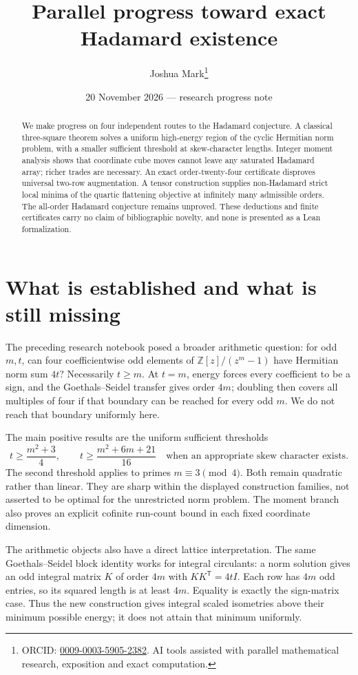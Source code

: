 \documentclass[11pt]{article}
\title{Parallel progress toward exact Hadamard existence}
\author{Joshua Mark\thanks{ORCID: \href{https://orcid.org/0009-0003-5905-2382}{0009-0003-5905-2382}. AI tools assisted with parallel mathematical research, exposition and exact computation.}}
\date{20 November 2026 --- research progress note}
\newcommand{\Z}{\mathbb Z}
\begin{document}
\maketitle
\begin{abstract}
We make progress on four independent routes to the Hadamard conjecture.
A classical three-square theorem solves a uniform high-energy region of
the cyclic Hermitian norm problem, with a smaller sufficient threshold
at skew-character lengths. Integer moment analysis shows that coordinate
cube moves cannot leave any saturated Hadamard array; richer trades are
necessary. An exact order-twenty-four certificate disproves universal
two-row augmentation. A tensor construction supplies non-Hadamard strict
local minima of the quartic flattening objective at infinitely many
admissible orders. The all-order Hadamard conjecture remains unproved.
These deductions and finite certificates carry no claim of bibliographic
novelty, and none is presented as a Lean formalization.
\end{abstract}

\section{What is established and what is still missing}
The preceding research notebook posed a broader arithmetic question:
for odd $m,t$, can four coefficientwise odd elements of
$\Z[z]/(z^m-1)$ have Hermitian norm sum $4t$? Necessarily $t\ge m$.
At $t=m$, energy forces every coefficient to be a sign, and the
Goethals--Seidel transfer gives order $4m$; doubling then covers all
multiples of four if that boundary can be reached for every odd $m$.
We do not reach that boundary uniformly here.

The main positive results are the uniform sufficient thresholds
\[
 t\ge\frac{m^2+3}{4},\qquad
 t\ge\frac{m^2+6m+21}{16}
 \quad\text{when an appropriate skew character exists}.
\]
The second threshold applies to primes $m\equiv3\pmod4$. Both remain
quadratic rather than linear. They are sharp within the displayed
construction families, not asserted to be optimal for the unrestricted
norm problem. The moment branch also proves an explicit cofinite
run-count bound in each fixed coordinate dimension.

The arithmetic objects also have a direct lattice interpretation.
The same Goethals--Seidel block identity works for integral circulants:
a norm solution gives an odd integral matrix $K$ of order $4m$ with
$KK^{\mathsf T}=4tI$. Each row has $4m$ odd entries, so its squared
length is at least $4m$. Equality is exactly the sign-matrix case.
Thus the new construction gives integral scaled isometries above their
minimum possible energy; it does not attain that minimum uniformly.
\end{document}
